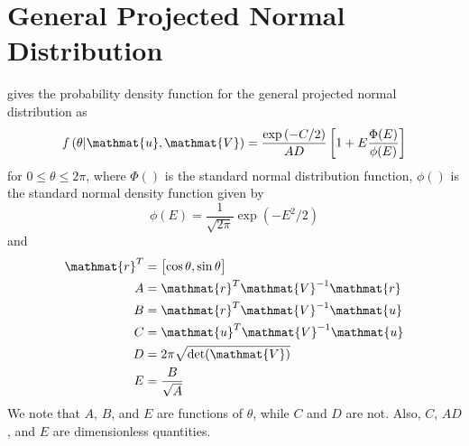 \documentclass[12pt]{report}
\newcommand{\mat}[1]{\mathmat{#1}}
\begin{document}
\section{General Projected Normal Distribution}\label{9.1.1}
\citet[(1)]{Hernandez2017} gives the probability density function for the general projected normal distribution as
%
\begin{equation}\label{9.1.2}
    f\left( \theta | \mat{u}, \mat{V} \right)
    = \frac{\exp{(-C/2)}}{AD} \left[ 1 + E \frac{\Phi(E)}{\phi(E)} \right]
\end{equation}
%
for $0 \le \theta \le 2\pi$, where $\Phi()$ is the standard normal distribution function, $\phi()$ is the standard normal density function given by
%
\begin{equation}\label{9.1.3}
    \phi(E) = \frac{1}{\sqrt{2 \pi}} \exp{\left(-E^2/2\right)}
\end{equation}
%
and
%
\begin{align}
    \mat{r}^T &= \begin{bmatrix}\cos{\theta}, \sin{\theta} \end{bmatrix} \\
    A &= \mat{r}^T \mat{V}^{-1} \mat{r} \\
    B &= \mat{r}^T \mat{V}^{-1} \mat{u} \\
    C &= \mat{u}^T \mat{V}^{-1} \mat{u} \\
    D &= 2 \pi \sqrt{\text{det}(\mat{V})} \\
    E &= \frac{B}{\sqrt{A}}
\end{align}
%
We note that $A$, $B$, and $E$ are functions of $\theta$, while $C$ and $D$ are not. Also, $C$, $AD$, and $E$ are dimensionless quantities.
\end{document}
